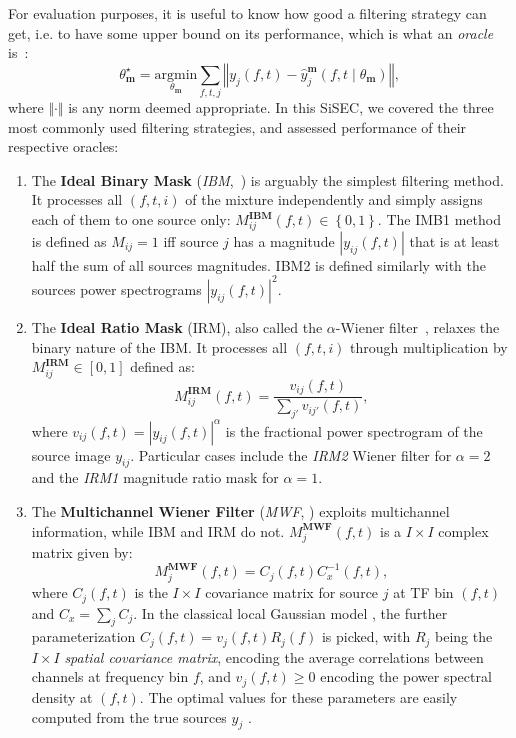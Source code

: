 \documentclass{llncs}
\newcommand{\sboxed}[1]{\textbf{#1}}
\newcommand{\thet}[1]{\theta_{\sboxed{#1}}}
\newcommand{\ft}{\left(f,t\right)}
\newcommand{\ftt}[1]{\left(f,t\mid\thet{#1}\right)}
\begin{document}
For evaluation purposes, it is useful to know how good a filtering strategy can get, i.e. to have some upper bound on its performance, which is what an \textit{oracle} is~\cite{vincent2007oracle}:
\begin{equation}
  \thet{m}^{\star}=\underset{\thet{m}}{\text{argmin}}\sum_{f,t,j}\left\Vert y_{j}\ft-\hat{y}_{j}^{\sboxed{m}}\ftt{m}\right\Vert,
  \end{equation}
where $\Vert\cdot\Vert$ is any norm deemed appropriate. In this SiSEC, we covered the three most commonly used filtering strategies, and assessed performance of their respective oracles:
\begin{enumerate}
  \item The \textbf{Ideal Binary Mask} (\textit{IBM},~\cite{wang2005}) is arguably the simplest filtering method. It processes all $\left(f,t,i\right)$ of the mixture independently and simply assigns each of them to one source only:   $M_{ij}^\sboxed{IBM}\ft\in\left\{0,1\right\}$. The IMB1 method is defined as $M_{ij}=1$ iff source $j$ has a magnitude $\left|y_{ij}(f,t)\right|$ that is at least half the sum of all sources magnitudes. IBM2 is defined similarly with the sources power spectrograms $\left|y_{ij}(f,t)\right|^2$.
  \item The \textbf{Ideal Ratio Mask} (IRM), also called the $\alpha$-Wiener filter~\cite{liutkus15}, relaxes the binary nature of the IBM. It processes all $\left(f,t,i\right)$ through multiplication by $M_{ij}^\sboxed{IRM}\in\left[0,1\right]$ defined as:
  \begin{equation}
    M^{\sboxed{IRM}}_{ij}\ft=\frac{v_{ij}\ft}{\sum_{j'}v_{ij'}\ft},
  \end{equation}
where $v_{ij}\ft=\left|y_{ij}\ft\right|^\alpha$ is the fractional power spectrogram of the source image $y_{ij}$. Particular cases include the \textit{IRM2} Wiener filter for $\alpha=2$ and the \textit{IRM1} magnitude ratio mask for $\alpha=1$.
  \item The \textbf{Multichannel Wiener Filter} (\textit{MWF}, \cite{duong10}) exploits multichannel information, while IBM and IRM do not. $M^{\sboxed{MWF}}_{j}\ft$ is a $I\times I$ complex matrix given by:
  \begin{equation}
    M_{j}^{\sboxed{MWF}}\ft=C_{j}\ft C_{x}^{-1}\ft,
  \end{equation}
where $C_j\ft$ is the $I\times I$ covariance matrix for source $j$ at TF bin $\ft$ and $C_x=\sum_j C_j$. In the classical local Gaussian model \cite{duong10}, the further parameterization $C_j\ft=v_j\ft R_j\left(f\right)$ is picked, with $R_j$ being the $I\times I$ \textit{spatial covariance matrix}, encoding the average correlations between channels at frequency bin $f$, and $v_j\ft\geq0$ encoding the power spectral density at $\ft$. The optimal values for these parameters are easily computed from the true sources $y_j$ \cite{liutkus2013}.
\end{enumerate}
\end{document}
